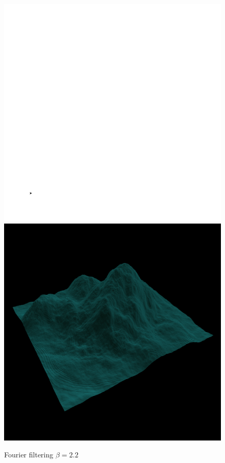 	\begin{figure}[H]
	  \centering
	  \includegraphics[width=\imagewidth]{images/results/terrains/512-1/fourier/22}
	  \includegraphics[width=\imagewidth]{images/results/terrains/512-1/fourier/22_3d}
	  \caption{Fourier filtering $\beta = 2.2$}
	  \label{fig:ex-fourier22-surface}
	\end{figure}
	

